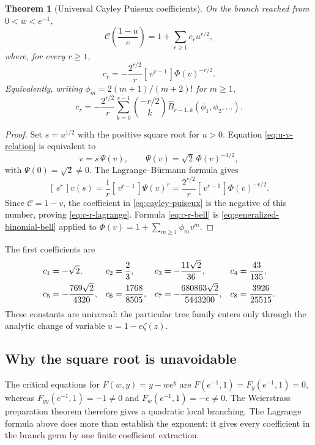 \documentclass[11pt,oneside]{article}
\numberwithin{equation}{section}
\theoremstyle{plain}
\newtheorem{theorem}{Theorem}[section]
\theoremstyle{definition}
\theoremstyle{remark}
\newcommand{\Cay}{\mathcal C}
\newcommand{\Bhat}{\widehat{B}}
\newcommand{\Coeff}[2]{[\,#1^{#2}\,]}
\begin{document}
\begin{theorem}[Universal Cayley Puiseux coefficients]\label{thm:cayley-coefficients}
On the branch reached from $0<w<e^{-1}$,
\begin{equation}\label{eq:cayley-puiseux}
 \Cay\!\left(\frac{1-u}{e}\right)
 =1+\sum_{r\ge1}c_r u^{r/2},
\end{equation}
where, for every $r\ge1$,
\begin{equation}\label{eq:c-r-lagrange}
 \boxed{
 c_r=-\frac{2^{r/2}}{r}\Coeff{v}{r-1}\Phi(v)^{-r/2}.}
\end{equation}
Equivalently, writing
$\phi_m=2(m+1)/(m+2)!$ for $m\ge1$,
\begin{equation}\label{eq:c-r-bell}
 \boxed{
 c_r=-\frac{2^{r/2}}r
 \sum_{k=0}^{r-1}\binom{-r/2}{k}
 \Bhat_{r-1,k}(\phi_1,\phi_2,\ldots).}
\end{equation}
\end{theorem}

\begin{proof}
Set $s=u^{1/2}$ with the positive square root for $u>0$.  Equation
\eqref{eq:u-v-relation} is equivalent to
\[
 v=s\,\Psi(v),\qquad \Psi(v)=\sqrt2\,\Phi(v)^{-1/2},
\]
with $\Psi(0)=\sqrt2\ne0$.  The Lagrange--B\"urmann formula gives
\[
 \Coeff{s}{r}v(s)=\frac1r\Coeff{v}{r-1}\Psi(v)^r
 =\frac{2^{r/2}}r\Coeff{v}{r-1}\Phi(v)^{-r/2}.
\]
Since $\Cay=1-v$, the coefficient in \eqref{eq:cayley-puiseux} is the
negative of this number, proving \eqref{eq:c-r-lagrange}.  Formula
\eqref{eq:c-r-bell} is \eqref{eq:generalized-binomial-bell} applied to
$\Phi(v)=1+\sum_{m\ge1}\phi_mv^m$.
\end{proof}

The first coefficients are
\begin{align}\label{eq:cayley-first-coeffs}
 c_1&=-\sqrt2,&
 c_2&=\frac23,&
 c_3&=-\frac{11\sqrt2}{36},&
 c_4&=\frac{43}{135},\notag\\
 c_5&=-\frac{769\sqrt2}{4320},&
 c_6&=\frac{1768}{8505},&
 c_7&=-\frac{680863\sqrt2}{5443200},&
 c_8&=\frac{3926}{25515}.
\end{align}
These constants are universal: the particular tree family enters only
through the analytic change of variable $u=1-e\zeta(z)$.

\subsection{Why the square root is unavoidable}

The critical equations for $F(w,y)=y-we^y$ are
$F(e^{-1},1)=F_y(e^{-1},1)=0$, whereas
$F_{yy}(e^{-1},1)=-1\ne0$ and $F_w(e^{-1},1)=-e\ne0$.
The Weierstrass preparation theorem therefore gives a quadratic local
branching.  The Lagrange formula above does more than establish the exponent:
it gives every coefficient in the branch germ by one finite coefficient
extraction.
\end{document}
